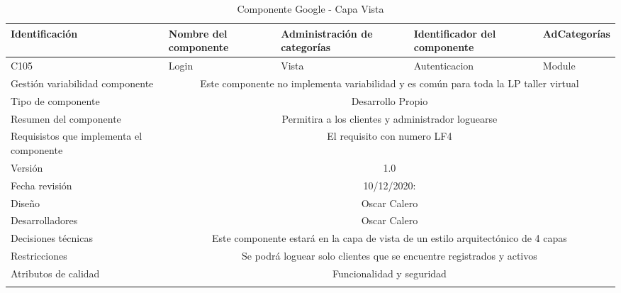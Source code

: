 \documentclass[10pt,a4paper,openany]{book}
\begin{document}
\begin{longtable}{|p{3cm}|p{3cm}|p{3cm}|p{3cm}|p{3cm}|} \hline
Identificación & Nombre del componente & Administración de categorías & Identificador del componente & AdCategorías \\[0.5ex] \hline
C105& Login& Vista& Autenticacion& Module\\[0.5ex] \hline
Gestión variabilidad componente & \multicolumn{4}{|c|}{Este componente no implementa variabilidad y es común para toda la LP taller virtual} \\ \hline
Tipo de componente & \multicolumn{4}{|c|}{Desarrollo Propio} \\ \hline
Resumen del componente & \multicolumn{4}{|c|}{Permitira a los clientes y administrador loguearse} \\ \hline
Requisistos que implementa el componente & \multicolumn{4}{|c|}{El requisito con numero LF4 } \\ \hline
Versión & \multicolumn{4}{|c|}{1.0 } \\ \hline
Fecha revisión & \multicolumn{4}{|c|}{ 10/12/2020:} \\ \hline
Diseño & \multicolumn{4}{|c|}{Oscar Calero} \\ \hline
Desarrolladores & \multicolumn{4}{|c|}{Oscar Calero} \\ \hline
Decisiones técnicas & \multicolumn{4}{|c|}{Este componente estará en la capa de vista de un estilo arquitectónico de 4 capas  } \\ \hline
Restricciones & \multicolumn{4}{|c|}{Se podrá loguear solo clientes que se encuentre registrados y activos} \\ \hline
Atributos de calidad & \multicolumn{4}{|c|}{Funcionalidad y seguridad} \\ \hline
\caption{Componente Google - Capa Vista}
\label{table:t6}
\end{longtable}
\end{document}
